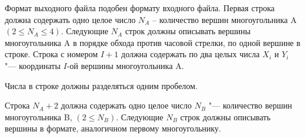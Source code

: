 Формат выходного файла подобен формату входного файла. 
Первая строка должна содержать одно целое число $N_A$ -- количество вершин многоугольника A $(2\le N_A \le 4)$.
Следующие $N_A$ строк должны описывать вершины многоугольника A в порядке обхода против часовой стрелки, по одной вершине в строке.
Строка с номером $I+1$ должна содержать по два целых числа $X_i$ и $Y_i$ "--- координаты $I$-ой вершины многоугольника A.

Числа в строке должны разделяться одним пробелом. 

Строка $N_A+2$ должна содержать одно целое число $N_B$ "--- количество вершин многоугольника B, $(2\le N_B)$.
Следующие $N_B$ строк должны описывать вершины в формате, аналогичном первому многоугольнику.


